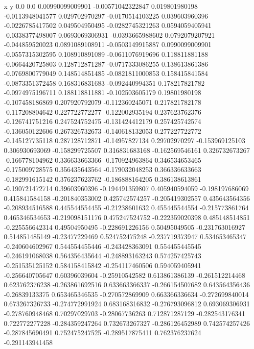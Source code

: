               x                y
            0.0              0.0
0.00990099009901  -0.00571042322847
 0.019801980198  -0.0113948041577
 0.029702970297  -0.0170514103225
 0.039603960396  -0.0226785417502
 0.049504950495  -0.0282745321263
0.0594059405941  -0.0338377498007
0.0693069306931  -0.0393665988602
0.0792079207921  -0.044859520023
0.0891089108911  -0.0503149915887
0.0990099009901  -0.0557315302595
 0.108910891089  -0.0611076919696
 0.118811881188  -0.0664420725803
 0.128712871287  -0.0717333086255
 0.138613861386  -0.0769800779049
 0.148514851485  -0.0821811000853
 0.158415841584  -0.0873351372458
 0.168316831683  -0.092440994351
 0.178217821782  -0.0974975196711
 0.188118811881  -0.102503605179
  0.19801980198  -0.107458186869
 0.207920792079  -0.112360245071
 0.217821782178  -0.117208804642
 0.227722772277  -0.122002935194
 0.237623762376  -0.126741751216
 0.247524752475  -0.131424412179
 0.257425742574  -0.136050122606
 0.267326732673  -0.140618132053
 0.277227722772  -0.145127735118
 0.287128712871   -0.14957827134
  0.29702970297  -0.153969125103
 0.306930693069  -0.158299725507
 0.316831683168  -0.162569546161
 0.326732673267  -0.166778104962
 0.336633663366  -0.170924963864
 0.346534653465  -0.175009728575
 0.356435643564  -0.179032048253
 0.366336633663  -0.182991615142
 0.376237623762  -0.186888164205
 0.386138613861  -0.190721472714
  0.39603960396  -0.194491359807
 0.405940594059  -0.198197686069
 0.415841584158  -0.201840353002
 0.425742574257  -0.205419302557
 0.435643564356  -0.208934516588
 0.445544554455   -0.21238601632
 0.455445544554  -0.215773861764
 0.465346534653  -0.219098151176
 0.475247524752  -0.222359020398
 0.485148514851  -0.225556642314
  0.49504950495  -0.228691226156
  0.50495049505  -0.231763016927
 0.514851485149   -0.23477229469
 0.524752475248  -0.237719373947
 0.534653465347  -0.240604602967
 0.544554455446  -0.243428363091
 0.554455445545  -0.246191068038
 0.564356435644  -0.248893163243
 0.574257425743  -0.251535125152
 0.584158415842  -0.254117460506
 0.594059405941  -0.256640705647
  0.60396039604   -0.25910542582
 0.613861386139  -0.261512214468
 0.623762376238  -0.263861692516
 0.633663366337  -0.266154507682
 0.643564356436   -0.26839133375
 0.653465346535  -0.270572869909
 0.663366336634  -0.272699840014
 0.673267326733  -0.274772991924
 0.683168316832  -0.276793096812
 0.693069306931  -0.278760948468
  0.70297029703   -0.28067736263
 0.712871287129  -0.282543176341
 0.722772277228  -0.284359247264
 0.732673267327  -0.286126452989
 0.742574257426  -0.287845690491
 0.752475247525  -0.289517875411
 0.762376237624  -0.291143941458
